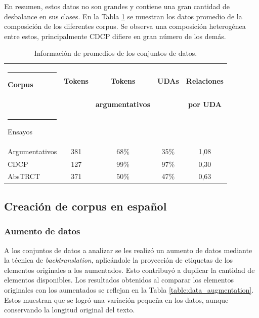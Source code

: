 \documentclass[a4paper,11pt,twocolumn,twoside]{article}
\begin{document}
En resumen, estos datos no son grandes y contiene una gran cantidad de desbalance en sus clases.
En la Tabla \ref{table:corpus_info} se muestran los datos promedio de la composición de los diferentes corpus. 
Se observa una composición heterogénea entre estos, principalmente CDCP difiere en gran número de los demás.

\begin{table}[h]
	\begin{center}
		\begin{tabular}{|l|c|c|c|c|} 
			\hline\rule{-2pt}{15pt}
			{\bf Corpus}                 & {\bf Tokens} & {\bf Tokens } 	   & {\bf UDAs} & {\bf Relaciones} \\
										 & 			    & {\bf argumentativos} & 			& {\bf por UDA} \\
			\hline\rule{-4pt}{10pt}
			Ensayos 	   		   &     	& 	                    & 	   & 	                \\
			Argumentativos 		   & 381    & 68\%                  & 35\% & 1,08               \\
			CDCP                   & 127    & 99\%                  & 97\% & 0,30               \\
			AbsTRCT                & 371    & 50\%                  & 47\% & 0,63               \\ 
			\hline
		\end{tabular}
	\end{center}
	\caption{\label{table:corpus_info}Información de promedios de los conjuntos de datos.}
\end{table}

\subsection{Creación de corpus en español}

\subsubsection{Aumento de datos}

A los conjuntos de datos a analizar se les realizó un aumento de datos mediante la técnica de \textit{backtranslation},
aplicándole la proyección de etiquetas de los elementos originales a los aumentados.
Esto contribuyó a duplicar la cantidad de elementos disponibles. Los resultados obtenidos al comparar los 
elementos originales con los aumentados se reflejan en la Tabla \ref{table:data_augmentation}.
Estos muestran que se logró una variación pequeña en los datos, aunque conservando la 
longitud original del texto. 
\end{document}
